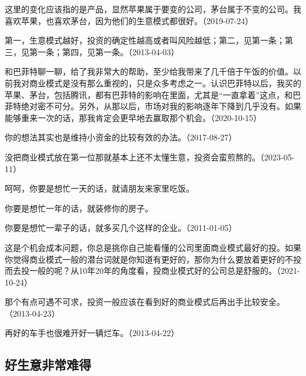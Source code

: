 
这里的变化应该指的是产品，显然苹果属于要变的公司，茅台属于不变的公司。我喜欢苹果，也喜欢茅台，因为他们的生意模式都很好。（2019-07-24）

第一，生意模式越好，投资的确定性越高或者叫风险越低；第二，见第一条；第三，见第一条；第四，见第一条。（2013-04-03）

和巴菲特聊一聊，给了我非常大的帮助，至少给我带来了几千倍于午饭的价值。以前我对商业模式是没有那么重视的，只是众多考虑之一。认识巴菲特以后，我买的苹果、茅台，包括腾讯，都有巴菲特的影响在里面，尤其是“一直拿着”这点，和巴菲特绝对密不可分。另外，从那以后，市场对我的影响逐年下降到几乎没有。如果能够重来一次的话，那我肯定会更早地去赢取那个机会。（2020-10-15）


你的想法其实也是维持小资金的比较有效的办法。（2017-08-27）

没把商业模式放在第一位那就基本上还不太懂生意，投资会蛮煎熬的。（2023-05-11）


呵呵，你要是想忙一天的话，就请朋友来家里吃饭。

你要是想忙一年的话，就装修你的房子。

你要是想忙一辈子的话，就多买几个这样的企业。（2011-01-05）


这是个机会成本问题，你总是挑你自己能看懂的公司里面商业模式最好的投。如果你觉得商业模式一般的潜台词就是你知道有更好的，那你为什么要放着更好的不投而去投一般的呢？从10年20年的角度看，投商业模式好的公司总是舒服的。（2021-10-24）


那个有点可遇不可求，投资一般应该在看到好的商业模式后再出手比较安全。（2013-04-23）

再好的车手也很难开好一辆烂车。（2013-04-22）

\subsection{好生意非常难得}

